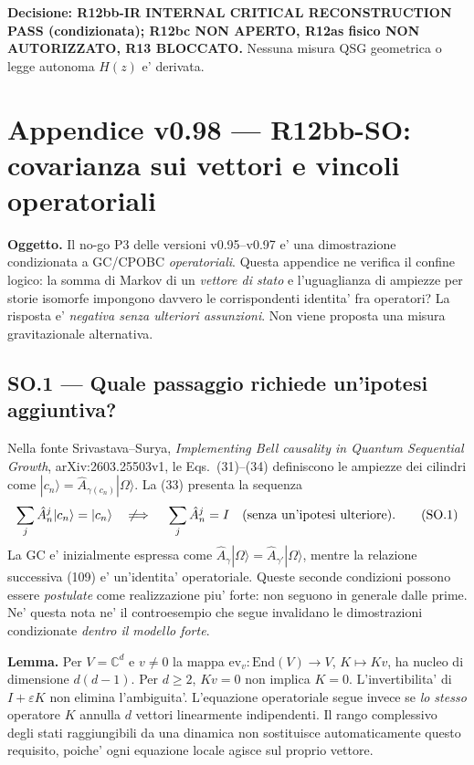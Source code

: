 \documentclass[11pt,a4paper]{article}
\begin{document}
\textbf{Decisione: R12bb-IR INTERNAL CRITICAL RECONSTRUCTION PASS (condizionata); R12bc NON APERTO, R12as fisico NON AUTORIZZATO, R13 BLOCCATO.} Nessuna misura QSG geometrica o legge autonoma $H(z)$ e' derivata.\par
\endgroup

\clearpage
\begingroup
\setlength{\parskip}{0.13em}
\section*{Appendice v0.98 --- R12bb-SO: covarianza sui vettori e vincoli operatoriali}
\textbf{Oggetto.} Il no-go P3 delle versioni v0.95--v0.97 e' una dimostrazione condizionata a GC/CPOBC \emph{operatoriali}. Questa appendice ne verifica il confine logico: la somma di Markov di un \emph{vettore di stato} e l'uguaglianza di ampiezze per storie isomorfe impongono davvero le corrispondenti identita' fra operatori? La risposta e' \emph{negativa senza ulteriori assunzioni}. Non viene proposta una misura gravitazionale alternativa.

\subsection*{SO.1 --- Quale passaggio richiede un'ipotesi aggiuntiva?}
Nella fonte Srivastava--Surya, \emph{Implementing Bell causality in Quantum Sequential Growth}, arXiv:2603.25503v1, le Eqs.~(31)--(34) definiscono le ampiezze dei cilindri come $|c_n\rangle=\hat A_{\gamma(c_n)}|\Omega\rangle$. La (33) presenta la sequenza
\begin{equation}
\sum_j\hat A_n^j|c_n\rangle=|c_n\rangle
\quad\not\!\!\implies\quad
\sum_j\hat A_n^j=I \quad\text{(senza un'ipotesi ulteriore).}\tag{SO.1}
\end{equation}
La GC e' inizialmente espressa come $\hat A_\gamma|\Omega\rangle=\hat A_{\gamma'}|\Omega\rangle$, mentre la relazione successiva (109) e' un'identita' operatoriale. Queste seconde condizioni possono essere \emph{postulate} come realizzazione piu' forte: non seguono in generale dalle prime. Ne' questa nota ne' il controesempio che segue invalidano le dimostrazioni condizionate \emph{dentro il modello forte}.

\textbf{Lemma.} Per $V=\mathbb C^d$ e $v\ne0$ la mappa $\mathrm{ev}_v:\mathrm{End}(V)\to V$, $K\mapsto Kv$, ha nucleo di dimensione $d(d-1)$. Per $d\ge2$, $Kv=0$ non implica $K=0$. L'invertibilita' di $I+\varepsilon K$ non elimina l'ambiguita'. L'equazione operatoriale segue invece se \emph{lo stesso} operatore $K$ annulla $d$ vettori linearmente indipendenti. Il rango complessivo degli stati raggiungibili da una dinamica non sostituisce automaticamente questo requisito, poiche' ogni equazione locale agisce sul proprio vettore.
\end{document}
